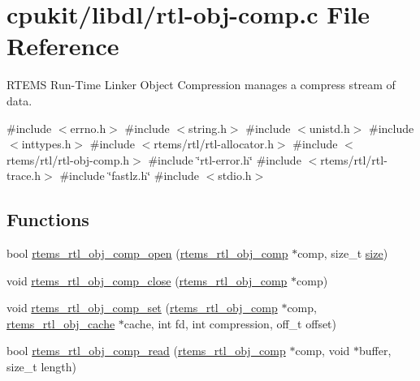 \hypertarget{rtl-obj-comp_8c}{}\section{cpukit/libdl/rtl-\/obj-\/comp.c File Reference}
\label{rtl-obj-comp_8c}


R\+T\+E\+MS Run-\/\+Time Linker Object Compression manages a compress stream of data.  


{\ttfamily \#include $<$errno.\+h$>$}\newline
{\ttfamily \#include $<$string.\+h$>$}\newline
{\ttfamily \#include $<$unistd.\+h$>$}\newline
{\ttfamily \#include $<$inttypes.\+h$>$}\newline
{\ttfamily \#include $<$rtems/rtl/rtl-\/allocator.\+h$>$}\newline
{\ttfamily \#include $<$rtems/rtl/rtl-\/obj-\/comp.\+h$>$}\newline
{\ttfamily \#include \char`\"{}rtl-\/error.\+h\char`\"{}}\newline
{\ttfamily \#include $<$rtems/rtl/rtl-\/trace.\+h$>$}\newline
{\ttfamily \#include \char`\"{}fastlz.\+h\char`\"{}}\newline
{\ttfamily \#include $<$stdio.\+h$>$}\newline
\subsection*{Functions}
\begin{DoxyCompactItemize}
\item 
bool \mbox{\hyperlink{rtl-obj-comp_8c_ae57c7af4f1fefa9e13f9ed00eb01dcf3}{rtems\+\_\+rtl\+\_\+obj\+\_\+comp\+\_\+open}} (\mbox{\hyperlink{rtl-obj-comp_8h_a5ac76d7cdc14a520157bd5c8a322f56c}{rtems\+\_\+rtl\+\_\+obj\+\_\+comp}} $\ast$comp, size\+\_\+t \mbox{\hyperlink{sun4u_2tte_8h_a245260f6f74972558f61b85227df5aae}{size}})
\item 
void \mbox{\hyperlink{rtl-obj-comp_8c_aa623f3df8f95696261fe1f558bff7873}{rtems\+\_\+rtl\+\_\+obj\+\_\+comp\+\_\+close}} (\mbox{\hyperlink{rtl-obj-comp_8h_a5ac76d7cdc14a520157bd5c8a322f56c}{rtems\+\_\+rtl\+\_\+obj\+\_\+comp}} $\ast$comp)
\item 
void \mbox{\hyperlink{rtl-obj-comp_8c_a53f6650db0abec0a0fae4ad5a5975baa}{rtems\+\_\+rtl\+\_\+obj\+\_\+comp\+\_\+set}} (\mbox{\hyperlink{rtl-obj-comp_8h_a5ac76d7cdc14a520157bd5c8a322f56c}{rtems\+\_\+rtl\+\_\+obj\+\_\+comp}} $\ast$comp, \mbox{\hyperlink{structrtems__rtl__obj__cache}{rtems\+\_\+rtl\+\_\+obj\+\_\+cache}} $\ast$cache, int fd, int compression, off\+\_\+t offset)
\item 
bool \mbox{\hyperlink{rtl-obj-comp_8c_a4ad76f30e119ef7536b1222220715a40}{rtems\+\_\+rtl\+\_\+obj\+\_\+comp\+\_\+read}} (\mbox{\hyperlink{rtl-obj-comp_8h_a5ac76d7cdc14a520157bd5c8a322f56c}{rtems\+\_\+rtl\+\_\+obj\+\_\+comp}} $\ast$comp, void $\ast$buffer, size\+\_\+t length)
\end{DoxyCompactItemize}


